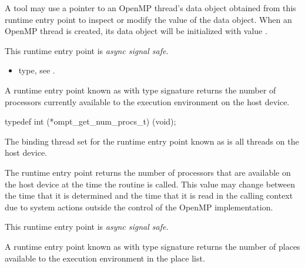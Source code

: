 A tool may use a pointer to an OpenMP thread's data object
obtained from this runtime entry point to
inspect or modify the value of the data object.
When an OpenMP thread is created, its data object will be initialized
with value .

This runtime entry point is \emph{async signal safe}.
\crossreferences
\begin{itemize}
\item {} type, see .
\end{itemize}


\label{sec:ompt_get_num_procs_t}

\summary

A runtime entry point known as
 with type signature
  returns
the number of processors currently available to the execution
environment on the host device.

\format

\begin{ccppspecific}
\begin{omptInquiry}
typedef int (*ompt_get_num_procs_t) (void);
\end{omptInquiry}
\end{ccppspecific}

\binding

The binding thread set for the runtime entry point known as
 is all threads on the host device.

\descr

The  runtime entry point returns the
number of processors that are available on the host device at the time
the routine is called. This value may change between the time that
it is determined and the time that it is read in the calling context due to
system actions outside the control of the OpenMP implementation.

This runtime entry point is \emph{async signal safe}.


\label{sec:ompt_get_num_places_t}
\label{sec:ompt_get_num_place}

\summary

A runtime entry point known as
 with type signature
  returns
the number of places available to the execution
environment in the place list.

